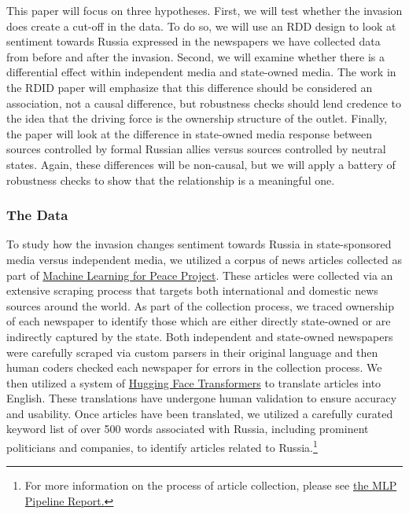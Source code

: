 \documentclass[12pt]{article}
\begin{document}
This paper will focus on three hypotheses. First, we will test whether the invasion does create a cut-off in the data. To do so, we will use an RDD design to look at sentiment towards Russia expressed in the newspapers we have collected data from before and after the invasion. Second, we will examine whether there is a differential effect within independent media and state-owned media. The work in the RDID paper will emphasize that this difference should be considered an association, not a causal difference, but robustness checks should lend credence to the idea that the driving force is the ownership structure of the outlet. Finally, the paper will look at the difference in state-owned media response between sources controlled by formal Russian allies versus sources controlled by neutral states. Again, these differences will be non-causal, but we will apply a battery of robustness checks to show that the relationship is a meaningful one.

\subsubsection*{The Data}

To study how the invasion changes sentiment towards Russia in state-sponsored media versus independent media, we utilized a corpus of news articles collected as part of \href{https://web.sas.upenn.edu/mlp-devlab/}{Machine Learning for Peace Project}. These articles were collected via an extensive scraping process that targets both international and domestic news sources around the world. As part of the collection process, we traced ownership of each newspaper to identify those which are either directly state-owned or are indirectly captured by the state. Both independent and state-owned newspapers were carefully scraped via custom parsers in their original language and then human coders checked each newspaper for errors in the collection process. We then utilized a system of \href{https://huggingface.co/}{Hugging Face Transformers} to translate articles into English. These translations have undergone human validation to ensure accuracy and usability. Once articles have been translated, we utilized a carefully curated keyword list of over 500 words associated with Russia, including prominent politicians and companies, to identify articles related to Russia.\footnote{For more information on the process of article collection, please see \href{https://web.sas.upenn.edu/mlp-devlab/technical-details-research/}{the MLP Pipeline Report.}}
\end{document}
